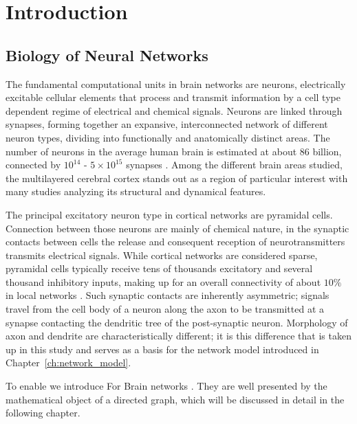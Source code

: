 \chapter{Introduction}\label{ch:Introduction} 



\section{Biology of Neural Networks}\label{sec:Biology} 


The fundamental computational units in brain networks are
neurons, electrically excitable cellular elements that
process and transmit information by a cell type dependent regime of
electrical and chemical signals. Neurons are linked through
synapses, forming together an expansive, interconnected
network of different neuron types, dividing into functionally and
anatomically distinct areas. The number of neurons in the average
human brain is estimated at about 86 billion, connected by
$10^{14}$ - $5\times10^{15}$ synapses \parencite{Herculano2009,
  Drachman2005}. Among the different brain areas studied, the
multilayered cerebral cortex stands out as a region of
particular interest with many studies analyzing its structural and
dynamical features.

The principal excitatory neuron type in cortical
networks are pyramidal cells. Connection between those neurons are mainly of chemical
nature, in the synaptic contacts between cells the release and
consequent reception of neurotransmitters transmits electrical
signals. While cortical networks are considered sparse, pyramidal
cells typically receive tens of thousands excitatory and several
thousand inhibitory inputs, making up for an overall connectivity of
about $10\%$ in local networks \parencite{Spruston2009}. Such synaptic
contacts are inherently asymmetric; signals travel from the cell body
of a neuron along the axon to be transmitted at a synapse contacting
the dendritic tree of the post-synaptic neuron. Morphology of axon and
dendrite are characteristically different; it is this difference that
is taken up in this study and serves as a basis for the network model introduced in Chapter~\ref{ch:network_model}.

To enable we introduce 
For Brain networks . They are well presented by the mathematical
object of a directed graph, which will be discussed in detail in the
following chapter.









